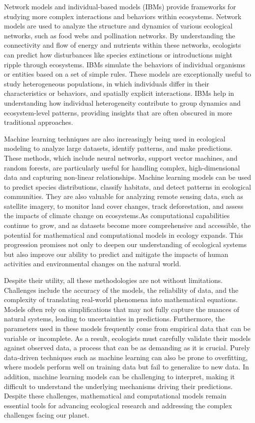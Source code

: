 Network models and individual-based models (IBMs) provide frameworks
for studying more complex interactions and behaviors within ecosystems. Network
models are used to analyze the structure and dynamics of various ecological
networks, such as food webs and pollination networks. By understanding the
connectivity and flow of energy and nutrients within these networks, ecologists
can predict how disturbances like species extinctions or introductions might
ripple through ecosystems. IBMs simulate the behaviors of individual organisms
or entities based on a set of simple rules. These models are exceptionally
useful to study heterogeneous populations, in which individuals differ in their
characteristics or behaviors, and spatially explicit interactions. IBMs help in
understanding how individual heterogeneity contribute to group dynamics and
ecosystem-level patterns, providing insights that are often obscured in more
traditional approaches.

Machine learning techniques are also increasingly being used in ecological
modeling to analyze large datasets, identify patterns, and make predictions.
These methods, which include neural networks, support vector machines, and
random forests, are particularly useful for handling complex, high-dimensional
data and capturing non-linear relationships. Machine learning models can be
used to predict species distributions, classify habitats, and detect patterns
in ecological communities. They are also valuable for analyzing remote sensing
data, such as satellite imagery, to monitor land cover changes, track
deforestation, and assess the impacts of climate change on ecosystems.As
computational capabilities continue to grow, and as datasets become more
comprehensive and accessible, the potential for mathematical and computational
models in ecology expands. This progression promises not only to deepen our
understanding of ecological systems but also improve our ability to predict and
mitigate the impacts of human activities and environmental changes on the
natural world.

Despite their utility, all these methodologies are not without limitations.
Challenges include the accuracy of the models, the reliability of data, and the
complexity of translating real-world phenomena into mathematical equations.
Models often rely on simplifications that may not fully capture the nuances of
natural systems, leading to uncertainties in predictions. Furthermore, the
parameters used in these models frequently come from empirical data that can be
variable or incomplete. As a result, ecologists must carefully validate their
models against observed data, a process that can be as demanding as it is
crucial. Purely data-driven techniques such as machine learning can also be
prone to overfitting, where models perform well on training data but fail to
generalize to new data. In addition,  machine learning models can be
challenging to interpret, making it difficult to understand the underlying
mechanisms driving their predictions. Despite these challenges, mathematical
and computational models remain essential tools for advancing ecological
research and addressing the complex challenges facing our planet.

